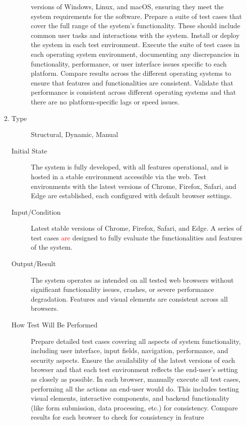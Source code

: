 \documentclass[12pt, titlepage]{article}
\newcommand{\rt}[1]{\textcolor{red}{#1}}
\begin{document}
\begin{enumerate}[NFR-T1]
\begin{description}
    versions of Windows, Linux, and macOS, ensuring they meet the system
    requirements for the software. Prepare a suite of test cases that cover the
    full range of the system's functionality. These should include common user
    tasks and interactions with the system. Install or deploy the system in each
    test environment. Execute the suite of test cases in each operating system
    environment, documenting any discrepancies in functionality, performance, or
    user interface issues specific to each platform. Compare results across the
    different operating systems to ensure that features and functionalities are
    consistent. Validate that performance is consistent across different
    operating systems and that there are no platform-specific lags or speed
    issues.
  \end{description}
\item \label{NFRT17}
  \begin{description}
  \item[Type] Structural, Dynamic, Manual
  \item[Initial State] The system is fully developed, with all features
    operational, and is hosted in a stable environment accessible via the web.
    Test environments with the latest versions of Chrome, Firefox, Safari, and
    Edge are established, each configured with default browser settings.
  \item[Input/Condition] Latest stable versions of Chrome, Firefox, Safari, and
    Edge. A series of test cases \rt{are} designed to fully evaluate the functionalities
    and features of the system.
  \item[Output/Result] The system operates as intended on all tested web
    browsers without significant functionality issues, crashes, or severe
    performance degradation. Features and visual elements are consistent across
    all browsers.
  \item[How Test Will Be Performed] Prepare detailed test cases covering all
    aspects of system functionality, including user interface, input fields,
    navigation, performance, and security aspects. Ensure the availability of
    the latest versions of each browser and that each test environment reflects
    the end-user's setting as closely as possible. In each browser, manually
    execute all test cases, performing all the actions an end-user would do.
    This includes testing visual elements, interactive components, and backend
    functionality (like form submission, data processing, etc.) for consistency.
    Compare results for each browser to check for consistency in feature

\end{description}
\end{enumerate}
\end{document}
